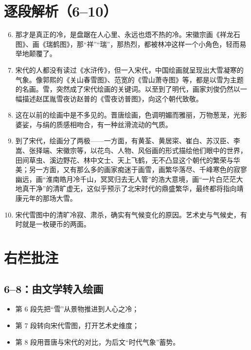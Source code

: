 \newpage

\begin{handoutlayout}

\section*{逐段解析（6--10）}

\begin{enumerate}[leftmargin=*,label=\protect\circnum{\arabic*},labelsep=0.8em,itemsep=0.9em]
\setcounter{enumi}{5}

\item 那才是真正的冷，是盘踞在人心里、永远也焐不热的冷。宋徽宗画《祥龙石图》、画《瑞鹤图》，那“祥”“瑞”，那热烈，都被林冲这样一个小角色，轻而易举地颠覆了。

\item 宋代的人都没有读过《水浒传》，但一入宋代，中国绘画就呈现出大雪凝寒的气象。像郭熙的《关山春雪图》、范宽的《雪山萧寺图》等，都是以雪为主题的名画。雪，突然成了宋代绘画的关键词。以至到了明代，画家刘俊仍然以一幅描述赵匡胤雪夜访赵普的《雪夜访普图》，向这个朝代致敬。

\item 这在以前的绘画中是不多见的。晋唐绘画，色调明媚而雅丽，万物葱茏，光影婆娑，与绢的质感相吻合，有一种丝滑流动的气质。

\item 到了宋代，绘画分了两极——一方面，有黄荃、黄居寀、崔白、苏汉臣、李嵩、张择端、宋徽宗等，以花鸟、人物、风俗画的形式描绘他们眼中的世界，田间草虫、溪边野花、林中文士、天上飞鹤，无不凸显这个朝代的繁荣与华美；另一方面，又有那么多的画家痴迷于画雪，画繁华落尽、千峰寒色的寂寥幽远，画“淮南皓月冷千山，冥冥归去无人管”的浩大意境，画“一片白茫茫大地真干净”的清旷虚无，这似乎预示了北宋时代的鼎盛繁华，最终都将指向靖康元年的那场大雪。

\item 宋代雪图中的清旷冷寂、肃杀，确实有气候变化的原因。艺术史与气候史，有时就是一枚硬币的两面。

\end{enumerate}

\switchcolumn

\section*{右栏批注}

\begin{structurebox}
\subsection*{6--8：由文学转入绘画}
\begin{itemize}[leftmargin=*]
    \item 第 6 段先把“雪”从景物推进到人心之冷；
    \item 第 7 段转向宋代雪图，打开艺术史维度；
    \item 第 8 段用晋唐与宋代的对比，为后文“时代气象”蓄势。
\end{itemize}
\end{structurebox}


\end{handoutlayout}
